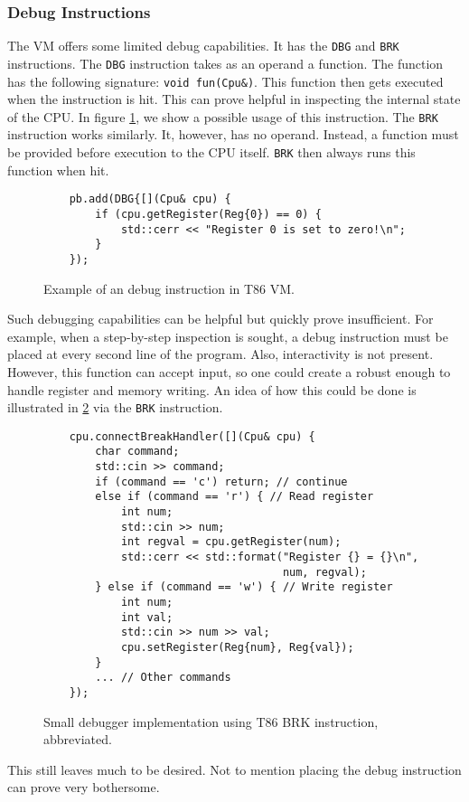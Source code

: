 \subsubsection{Debug Instructions}\label{section:t86-debug-cap}
The VM offers some limited debug capabilities. It has the \texttt{DBG} and
\texttt{BRK} instructions. The \texttt{DBG} instruction takes as an operand a
function. The function has the following signature: \texttt{void fun(Cpu\&)}.
This function then gets executed when the instruction is hit. This can prove
helpful in inspecting the internal state of the CPU. In figure
\ref{fig:t86-debug}, we show a possible usage of this instruction. The
\texttt{BRK} instruction works similarly. It, however, has no operand. Instead,
a function must be provided before execution to the CPU itself. \texttt{BRK}
then always runs this function when hit.

\begin{figure}
    \begin{verbatim}
    pb.add(DBG{[](Cpu& cpu) {
        if (cpu.getRegister(Reg{0}) == 0) {
            std::cerr << "Register 0 is set to zero!\n";
        }
    });
    \end{verbatim}
    \caption{Example of an debug instruction in T86 VM.}
    \label{fig:t86-debug}
\end{figure}

Such debugging capabilities can be helpful but quickly prove insufficient. For
example, when a step-by-step inspection is sought, a debug instruction must be
placed at every second line of the program. Also, interactivity is not present.
However, this function can accept input, so one could create a robust enough to
handle register and memory writing. An idea of how this could be done is
illustrated in \ref{fig:t86-pocket-debugger} via the \texttt{BRK} instruction.

\begin{figure}
    \begin{verbatim}
    cpu.connectBreakHandler([](Cpu& cpu) {
        char command;
        std::cin >> command;
        if (command == 'c') return; // continue
        else if (command == 'r') { // Read register
            int num;
            std::cin >> num;
            int regval = cpu.getRegister(num);
            std::cerr << std::format("Register {} = {}\n",
                                     num, regval);
        } else if (command == 'w') { // Write register
            int num;
            int val;
            std::cin >> num >> val;
            cpu.setRegister(Reg{num}, Reg{val});
        }
        ... // Other commands
    });
    \end{verbatim}
    \caption{Small debugger implementation using T86 BRK instruction, abbreviated.}
    \label{fig:t86-pocket-debugger}
\end{figure}

This still leaves much to be desired. Not to mention placing the debug
instruction can prove very bothersome.
